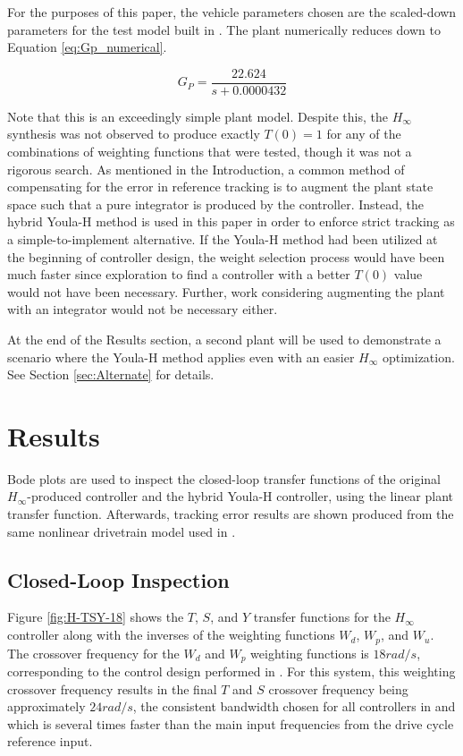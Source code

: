\documentclass[journal,article,submit,pdftex,moreauthors]{Definitions/mdpi}
\begin{document}
For the purposes of this paper, the vehicle parameters chosen are the scaled-down parameters for the test model built in \citep{tan2025scaling}. The plant numerically reduces down to Equation \ref{eq:Gp_numerical}.

\begin{equation} \label{eq:Gp_numerical}
G_{P} = \frac{22.624}{s+0.0000432}
\end{equation}

Note that this is an exceedingly simple plant model. Despite this, the $H_{\infty}$ synthesis was not observed to produce exactly  $T(0)=1$ for any of the combinations of weighting functions that were tested, though it was not a rigorous search. As mentioned in the Introduction, a common method of compensating for the error in reference tracking is to augment the plant state space such that a pure integrator is produced by the controller. Instead, the hybrid Youla-H method is used in this paper in order to enforce strict tracking as a simple-to-implement alternative. If the Youla-H method had been utilized at the beginning of controller design, the weight selection process would have been much faster since exploration to find a controller with a better $T(0)$ value would not have been necessary. Further, work considering augmenting the plant with an integrator would not be necessary either.

At the end of the Results section, a second plant will be used to demonstrate a scenario where the Youla-H method applies even with an easier $H_\infty$ optimization. See Section \ref{sec:Alternate} for details.

\section{Results}
Bode plots are used to inspect the closed-loop transfer functions of the original $H_{\infty}$-produced controller and the hybrid Youla-H controller, using the linear plant transfer function. Afterwards, tracking error results are shown produced from the same nonlinear drivetrain model used in \citep{tan2025scaling}.

\subsection{Closed-Loop Inspection}
Figure \ref{fig:H-TSY-18} shows the $T$, $S$, and $Y$ transfer functions for the $H_{\infty}$ controller along with the inverses of the weighting functions $W_d$, $W_p$, and $W_u$. The crossover frequency for the $W_d$ and $W_p$ weighting functions is $18 rad/s$, corresponding to the control design performed in \citep{tan2025scaling}. For this system, this weighting crossover frequency results in the final $T$ and $S$ crossover frequency being approximately $24 rad/s$, the consistent bandwidth chosen for all controllers in \citep{tan2025scaling} and which is several times faster than the main input frequencies from the drive cycle reference input.
\end{document}
